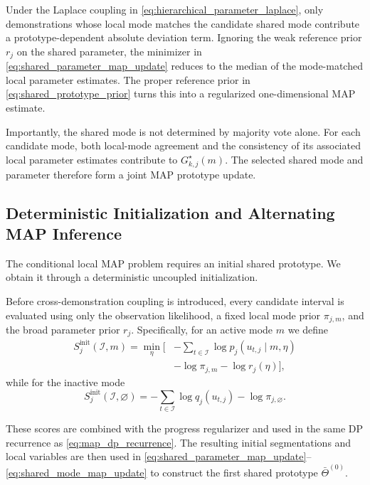 \documentclass[lettersize,journal]{IEEEtran}
\begin{document}
Under the Laplace coupling in
\eqref{eq:hierarchical_parameter_laplace}, only demonstrations whose local mode
matches the candidate shared mode contribute a prototype-dependent absolute
deviation term. Ignoring the weak reference prior $r_j$ on the shared
parameter, the minimizer in
\eqref{eq:shared_parameter_map_update} reduces to the median of the
mode-matched local parameter estimates. The proper reference prior in
\eqref{eq:shared_prototype_prior} turns this into a regularized one-dimensional
MAP estimate.

Importantly, the shared mode is not determined by majority vote alone.
For each candidate mode, both local-mode agreement and the consistency of its
associated local parameter estimates contribute to
$G_{k,j}^{\star}(m)$. The selected shared mode and parameter therefore form a
joint MAP prototype update.


\subsection{Deterministic Initialization and Alternating MAP Inference}
\label{subsec:alternating_map_inference}

The conditional local MAP problem requires an initial shared prototype.
We obtain it through a deterministic uncoupled initialization.

Before cross-demonstration coupling is introduced, every candidate interval is
evaluated using only the observation likelihood, a fixed local mode prior
$\pi_{j,m}$, and the broad parameter prior $r_j$. Specifically, for an active
mode $m$ we define
\begin{equation}
\begin{aligned}
S_{j}^{\mathrm{init}}
(\mathcal{I},m)
=
\min_{\eta}
\Bigg[
&
-
\sum_{t\in\mathcal{I}}
\log
p_j
\left(
u_{t,j}
\mid
m,\eta
\right)
\\
&
-
\log \pi_{j,m}
-
\log r_j(\eta)
\Bigg],
\end{aligned}
\label{eq:initial_local_map_score}
\end{equation}
while for the inactive mode
\begin{equation}
S_{j}^{\mathrm{init}}
(\mathcal{I},\varnothing)
=
-
\sum_{t\in\mathcal{I}}
\log q_j(u_{t,j})
-
\log\pi_{j,\varnothing}.
\label{eq:initial_inactive_map_score}
\end{equation}

These scores are combined with the progress regularizer and used in the same DP
recurrence as \eqref{eq:map_dp_recurrence}. The resulting initial segmentations
and local variables are then used in
\eqref{eq:shared_parameter_map_update}--\eqref{eq:shared_mode_map_update} to
construct the first shared prototype $\bar{\Theta}^{(0)}$.
\end{document}
